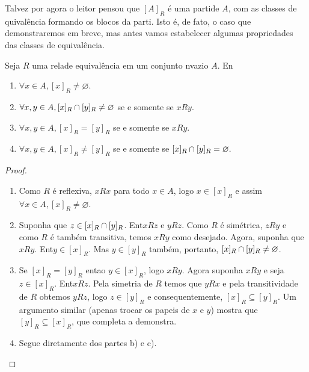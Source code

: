 Talvez por agora o leitor pensou que $[A]_R$ \'e uma parti\cao de $A$, com as classes de quival\^encia formando os blocos da parti\caoi. Isto \'e, de fato, o caso que demonstraremos em breve, mas antes vamos estabelecer algumas propriedades das classes de equival\^encia.
\begin{teob}\label{relteo1}
Seja $R$ uma rela\cao de equival\^encia em um conjunto n\ao vazio $A$. En\tao
\begin{enumerate}[{\bf a)}]
\item $\forall x\in A, [x]_R\neq\varnothing$.
\item $\forall x,y\in A, [x]_R\cap[y]_R\neq\varnothing$ se e somente se $xRy$.
\item $\forall x,y\in A,[x]_R=[y]_R$ se e somente se $xRy$.
\item $\forall x,y\in A, [x]_R\neq[y]_R$ se e somente se $[x]_R\cap[y]_R=\varnothing.$
\end{enumerate}
\end{teob}
\begin{proof}
 \begin{enumerate}[{\bf a)}]
\item Como $R$ \'e reflexiva, $xRx$ para todo $x\in A$, logo $x\in[x]_R$ e assim $\forall x\in A, [x]_R\neq\varnothing$.
\item Suponha que $z\in [x]_R\cap [y]_R$. Ent\ao $xRz$ e $yRz$. Como $R$ \'e sim\'etrica, $zRy$ e como $R$ \'e tamb\'em transitiva, temos $xRy$ como desejado. Agora, suponha que $xRy$. Ent\ao $y\in[x]_R$. Mas $y\in[y]_R$ tamb\'em, portanto, $[x]_R\cap[y]_R\neq\varnothing$. 
\item Se $[x]_R=[y]_R$ entao $y\in[x]_R$, logo $xRy$. Agora suponha $xRy$ e seja $z\in[x]_R$. Ent\ao $xRz$. Pela simetria de $R$ temos que $yRx$ e pela transitividade de $R$ obtemos $yRz$, logo $z\in[y]_R$ e consequentemente, $[x]_R\subseteq[y]_R$. Um argumento similar (apenas trocar os papeis de $x$ e $y$) mostra que $[y]_R\subseteq[x]_R$, que completa a demonstra\caoi.
\item Segue diretamente dos partes b) e c).
\end{enumerate}
\end{proof}
\\

